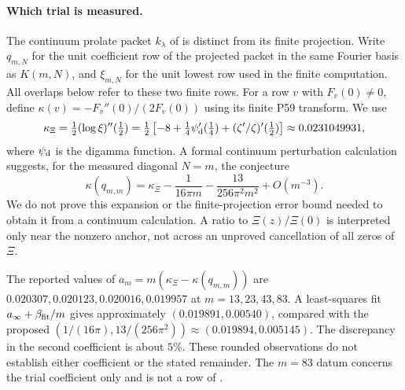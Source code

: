 \paragraph{Which trial is measured.}
The continuum prolate packet $k_\lambda$ of
\cite[\S7]{CCM-ZST-2025} is distinct from its finite projection.
Write $q_{m,N}$ for the unit coefficient row of the projected packet
in the same Fourier basis as $K(m,N)$, and $\xi_{m,N}$ for the unit
lowest row used in the finite computation. All overlaps below refer
to these two finite rows. For a row $v$ with $F_v(0)\ne0$, define
$\kappa(v)=-F_v''(0)/(2F_v(0))$ using its finite P59 transform.
We use
\[
 \kappa_\Xi=\tfrac12(\log\xi)''(\tfrac12)
 =\tfrac12\left[-8+\tfrac14\psi_{\rm d}'(\tfrac14)
                  +(\zeta'/\zeta)'(\tfrac12)\right]
 \approx0.0231049931,
\]
where $\psi_{\rm d}$ is the digamma function.
A formal continuum perturbation calculation suggests, for the
measured diagonal $N=m$, the conjecture
\begin{equation}\label{eq:trialjet}
 \kappa(q_{m,m})=\kappa_\Xi-\frac1{16\pi m}
                     -\frac{13}{256\pi^2m^2}+O(m^{-3}).
\end{equation}
We do not prove this expansion or the finite-projection error bound
needed to obtain it from a continuum calculation. A ratio to
$\Xi(z)/\Xi(0)$ is interpreted only near the nonzero anchor, not
across an unproved cancellation of all zeros of $\Xi$.

The reported values of
$a_m=m(\kappa_\Xi-\kappa(q_{m,m}))$ are
$0.020307,0.020123,0.020016,0.019957$ at $m=13,23,43,83$.
A least-squares fit $a_\infty+\beta_{\rm fit}/m$ gives approximately
$(0.019891,0.00540)$, compared with the proposed
$(1/(16\pi),13/(256\pi^2))\approx(0.019894,0.005145)$.
The discrepancy in the second coefficient is about $5\%$.
These rounded observations do not establish either coefficient or
the stated remainder. The $m=83$ datum concerns the trial coefficient
only and is not a row of .

